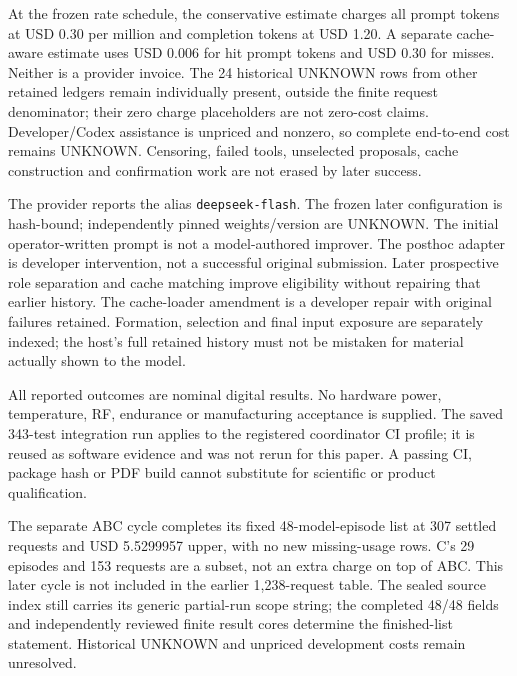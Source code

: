 At the frozen rate schedule, the conservative estimate charges all prompt
tokens at USD 0.30 per million and completion tokens at USD 1.20. A separate
cache-aware estimate uses USD 0.006 for hit prompt tokens and USD 0.30 for
misses. Neither is a provider invoice. The 24 historical UNKNOWN rows from
other retained ledgers remain individually present, outside the finite request
denominator; their zero charge placeholders are not zero-cost claims.
Developer/Codex assistance is unpriced and nonzero, so complete end-to-end
cost remains UNKNOWN. Censoring, failed tools, unselected proposals, cache
construction and confirmation work are not erased by later success.

The provider reports the alias \texttt{deepseek-flash}. The frozen later
configuration is hash-bound; independently pinned weights/version are UNKNOWN.
The initial operator-written prompt is not a model-authored improver. The
posthoc adapter is developer intervention, not a successful original submission.
Later prospective role separation and cache matching improve eligibility
without repairing that earlier history. The cache-loader amendment is a
developer repair with original failures retained. Formation, selection and
final input exposure are separately indexed; the host's full retained history
must not be mistaken for material actually shown to the model.

All reported outcomes are nominal digital results. No hardware power,
temperature, RF, endurance or manufacturing acceptance is supplied. The saved
343-test integration run applies to the registered coordinator CI profile;
it is reused as software evidence and was not rerun for this paper. A passing
CI, package hash or PDF build cannot substitute for scientific or product
qualification.

The separate ABC cycle completes its fixed 48-model-episode list at 307
settled requests and USD 5.5299957 upper, with no new missing-usage rows. C's
29 episodes and 153 requests are a subset, not an extra charge on top of ABC.
This later cycle is not included in the earlier 1,238-request table. The sealed
source index still carries its generic partial-run scope string; the completed
48/48 fields and independently reviewed finite result cores determine the
finished-list statement. Historical UNKNOWN and unpriced development costs
remain unresolved.

